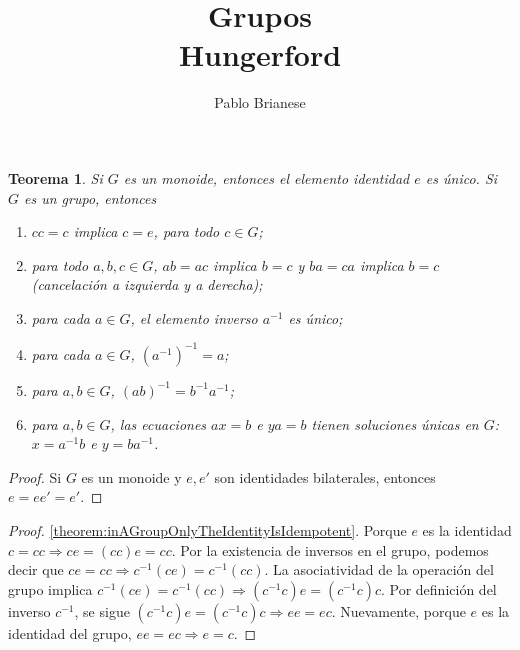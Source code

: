 \documentclass{report}
\title{Grupos \\ Hungerford}
\author{Pablo Brianese}
\newtheorem{theorem}{Teorema}
\theoremstyle{remark}
\begin{document}
  \maketitle

  \begin{theorem}
    Si \(G\) es un monoide, entonces el elemento identidad \(e\) es único.
    Si \(G\) es un grupo, entonces
    \begin{enumerate}
      \item
        \label{theorem:inAGroupOnlyTheIdentityIsIdempotent}
        \(cc = c\) implica \(c = e\), para todo \(c \in G\);
      \item
        \label{theorem:leftAndRightCancellationInAGroup}
        para todo \(a, b, c \in G\), \(a b = a c\) implica \(b = c\) y \(b a = c a\) implica \(b = c\) (cancelación a izquierda y a derecha);
      \item
        \label{theorem:uniquenessOfInverseElement}
        para cada \(a \in G\), el elemento inverso \(a^{- 1}\) es único;
      \item
        \label{theorem:takingInversesIsAnInvolutiveOperation}
        para cada \(a \in G\), \((a^{- 1})^{- 1} = a\);
      \item
        \label{theorem:inverseOfAProductFormula}
        para \(a, b \in G\), \((a b)^{- 1} = b^{- 1} a^{- 1}\);
      \item para \(a, b \in G\), las ecuaciones \(a x = b\) e \(y a = b\) tienen soluciones únicas en \(G\): \(x = a^{- 1} b\) e \(y = b a^{- 1}\).
    \end{enumerate}
  \end{theorem}
  \begin{proof} 
    Si \(G\) es un monoide y \(e, e'\) son identidades bilaterales, entonces \(e = e e' = e'\).
  \end{proof}
  \begin{proof} \ref{theorem:inAGroupOnlyTheIdentityIsIdempotent}.
    Porque \(e\) es la identidad
    \(
      c = c c
      \Rightarrow
      c e = (c c) e = c c
    \).
    Por la existencia de inversos en el grupo, podemos decir que 
    \(
      c e = c c
      \Rightarrow
      c^{- 1} (c e) = c^{- 1} (c c)
    \).
    La asociatividad de la operación del grupo implica 
    \(
      c^{- 1} (c e) = c^{- 1} (c c)
      \Rightarrow
      (c^{- 1} c) e = (c^{- 1} c) c
    \).
    Por definición del inverso \(c^{-1}\), se sigue
    \(
      (c^{- 1} c) e = (c^{- 1} c) c
      \Rightarrow
      e e = e c
    \).
    Nuevamente, porque \(e\) es la identidad del grupo,
    \(
      e e = e c
      \Rightarrow
      e = c
    \).
  \end{proof}
\end{document}
